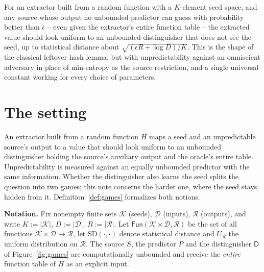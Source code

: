 \documentclass{conjura-conjecture}
\newcommand{\Fun}{\mathsf{Fun}}
\newcommand{\SD}{\mathrm{SD}}
\newcommand{\calK}{\mathcal{K}}
\newcommand{\calD}{\mathcal{D}}
\newcommand{\calR}{\mathcal{R}}
\begin{document}

\vspace{0.4em}

\begin{informalconjecture}
For an extractor built from a random function with a $K$-element seed space, and any source
whose output no unbounded predictor can guess with probability better than $\epsilon$ -- even
given the extractor's entire function table -- the extracted value should look uniform to an
unbounded distinguisher that does not see the seed, up to statistical distance about
$\sqrt{(\epsilon R + \log D)/K}$. This is the shape of the classical leftover hash lemma, but
with unpredictability against an omniscient adversary in place of min-entropy as the source
restriction, and a single universal constant working for every choice of parameters.
\end{informalconjecture}

\section{The setting}\label{sec:setting}

An extractor built from a random function $H$ maps a seed and an unpredictable source's output
to a value that should look uniform to an unbounded distinguisher holding the source's auxiliary
output and the oracle's entire table.  Unpredictability is measured against an equally unbounded
predictor with the same information.  Whether the distinguisher also learns the seed splits the
question into two games; this note concerns the harder one, where the seed stays hidden from it.
Definition~\ref{def:games} formalizes both notions.

\smallskip
\noindent\textbf{Notation.}
Fix nonempty finite sets $\calK$ (seeds), $\calD$ (inputs), $\calR$ (outputs), and write
$K := |\calK|$, $D := |\calD|$, $R := |\calR|$.  Let $\Fun(\calK \times \calD, \calR)$ be the set
of all functions $\calK \times \calD \to \calR$, let $\SD(\cdot,\cdot)$ denote statistical
distance and $U_{\calR}$ the uniform distribution on $\calR$.  The source $S$, the predictor $P$
and the distinguisher $\mathsf{D}$ of Figure~\ref{fig:games} are computationally unbounded and
receive the \emph{entire} function table of $H$ as an explicit input.
\end{document}
